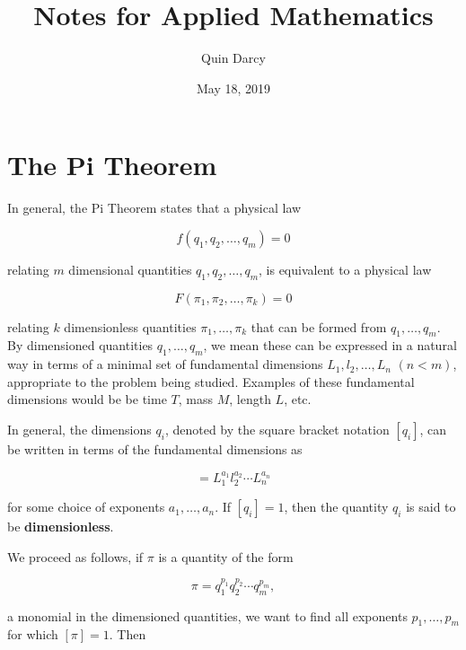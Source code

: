 \documentclass{article}
\theoremstyle{definition}
\theoremstyle{remark}
\theoremstyle{definition}
\begin{document}
\title{Notes for Applied Mathematics}
\author{Quin Darcy}
\date{May 18, 2019}
\maketitle

\section{The Pi Theorem}

In general, the Pi Theorem states that a physical law 

\begin{equation}
    f(q_1, q_2, \dots, q_m)=0
\end{equation}

\noindent relating $m$ dimensional quantities $q_1, q_2, \dots, q_m$, is equivalent to a physical law 

\begin{equation}
    F(\pi_1, \pi_2, \dots, \pi_k)=0
\end{equation}

\noindent relating $k$ dimensionless quantities $\pi_1, \dots, \pi_k$ that can be formed from $q_1, \dots, q_m$. By dimensioned quantities $q_1, \dots, q_m$, we mean these can be expressed in a natural way in terms of a minimal set of fundamental dimensions $L_1, l_2, \dots, L_n$ $(n<m)$, appropriate to the problem being studied. Examples of these fundamental dimensions would be be time $T$, mass $M$, length  $L$, etc.\par In general, the dimensions $q_i$, denoted by the square bracket notation $[q_i]$, can be written in terms of the fundamental dimensions as 

\begin{equation}
    [q_i]=L_1^{a_1}l_2^{a_2}\cdots L_n^{a_n}
\end{equation}

\noindent for some choice of exponents $a_1, \dots, a_n$. If $[q_i]=1$, then the quantity $q_i$ is said to be \textbf{dimensionless}.\par We proceed as follows, if $\pi$ is a quantity of the form 

\begin{equation}
    \pi=q_1^{p_1}q_2^{p_2}\cdots q_m^{p_m},
\end{equation}

\noindent a monomial in the dimensioned quantities, we want to find all exponents $p_1, \dots, p_m$ for which $[\pi]=1$. Then 
\end{document}
